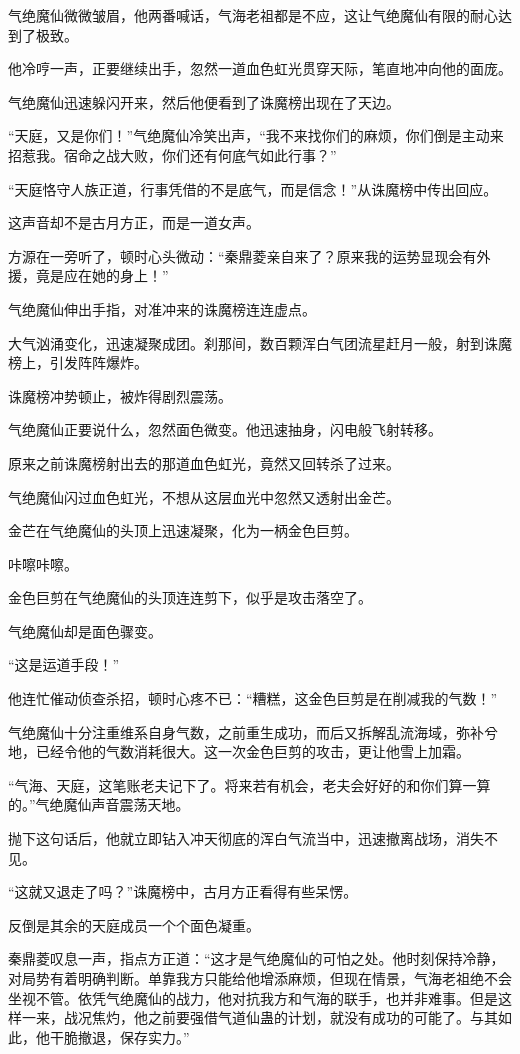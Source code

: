\begin{this_body}
气绝魔仙微微皱眉，他两番喊话，气海老祖都是不应，这让气绝魔仙有限的耐心达到了极致。

他冷哼一声，正要继续出手，忽然一道血色虹光贯穿天际，笔直地冲向他的面庞。

气绝魔仙迅速躲闪开来，然后他便看到了诛魔榜出现在了天边。

“天庭，又是你们！”气绝魔仙冷笑出声，“我不来找你们的麻烦，你们倒是主动来招惹我。宿命之战大败，你们还有何底气如此行事？”

“天庭恪守人族正道，行事凭借的不是底气，而是信念！”从诛魔榜中传出回应。

这声音却不是古月方正，而是一道女声。

方源在一旁听了，顿时心头微动：“秦鼎菱亲自来了？原来我的运势显现会有外援，竟是应在她的身上！”

气绝魔仙伸出手指，对准冲来的诛魔榜连连虚点。

大气汹涌变化，迅速凝聚成团。刹那间，数百颗浑白气团流星赶月一般，射到诛魔榜上，引发阵阵爆炸。

诛魔榜冲势顿止，被炸得剧烈震荡。

气绝魔仙正要说什么，忽然面色微变。他迅速抽身，闪电般飞射转移。

原来之前诛魔榜射出去的那道血色虹光，竟然又回转杀了过来。

气绝魔仙闪过血色虹光，不想从这层血光中忽然又透射出金芒。

金芒在气绝魔仙的头顶上迅速凝聚，化为一柄金色巨剪。

咔嚓咔嚓。

金色巨剪在气绝魔仙的头顶连连剪下，似乎是攻击落空了。

气绝魔仙却是面色骤变。

“这是运道手段！”

他连忙催动侦查杀招，顿时心疼不已：“糟糕，这金色巨剪是在削减我的气数！”

气绝魔仙十分注重维系自身气数，之前重生成功，而后又拆解乱流海域，弥补兮地，已经令他的气数消耗很大。这一次金色巨剪的攻击，更让他雪上加霜。

“气海、天庭，这笔账老夫记下了。将来若有机会，老夫会好好的和你们算一算的。”气绝魔仙声音震荡天地。

抛下这句话后，他就立即钻入冲天彻底的浑白气流当中，迅速撤离战场，消失不见。

“这就又退走了吗？”诛魔榜中，古月方正看得有些呆愣。

反倒是其余的天庭成员一个个面色凝重。

秦鼎菱叹息一声，指点方正道：“这才是气绝魔仙的可怕之处。他时刻保持冷静，对局势有着明确判断。单靠我方只能给他增添麻烦，但现在情景，气海老祖绝不会坐视不管。依凭气绝魔仙的战力，他对抗我方和气海的联手，也并非难事。但是这样一来，战况焦灼，他之前要强借气道仙蛊的计划，就没有成功的可能了。与其如此，他干脆撤退，保存实力。”


\end{this_body}
